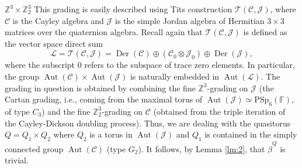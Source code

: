 \documentclass[a4paper,reqno]{amsart}
\theoremstyle{definition}
\numberwithin{theorem}{section}
\numberwithin{equation}{section}
\begin{document}
$\boxed{{\mathbb{Z}}^3\times{\mathbb{Z}}_2^3}$\quad 
This grading is easily described using Tits construction ${\mathcal{T}}({\mathcal{C}},{\mathcal{J}})$, where ${\mathcal{C}}$ is the Cayley algebra and ${\mathcal{J}}$ is the simple Jordan algebra of Hermitian $3\times 3$ matrices over the quaternion algebra. Recall again that ${\mathcal{T}}({\mathcal{C}},{\mathcal{J}})$ is defined as the vector space direct sum
\[
{\mathcal{L}}={\mathcal{T}}({\mathcal{C}},{\mathcal{J}})=\operatorname{\mathrm{Der}}({\mathcal{C}})\oplus({\mathcal{C}}_0\otimes{\mathcal{J}}_0)\oplus\operatorname{\mathrm{Der}}({\mathcal{J}}),
\]
where the subscript $0$ refers to the subspace of trace zero elements. 
In particular, the group $\operatorname{\mathrm{Aut}}({\mathcal{C}})\times\operatorname{\mathrm{Aut}}({\mathcal{J}})$ is naturally embedded in $\operatorname{\mathrm{Aut}}({\mathcal{L}})$.
The grading in question is obtained by combining the fine ${\mathbb{Z}}^3$-grading on ${\mathcal{J}}$ (the Cartan grading, i.e., coming from the maximal torus of $\operatorname{\mathrm{Aut}}({\mathcal{J}})\simeq{\mathrm{PSp}}_6({\mathbb{F}})$, of type $C_3$) and the fine ${\mathbb{Z}}_2^3$-grading on ${\mathcal{C}}$ (obtained from the triple iteration of the Cayley-Dickson doubling process). 
Thus, we are dealing with the quasitorus $Q=Q_1\times Q_2$ where $Q_2$ is a torus in $\operatorname{\mathrm{Aut}}({\mathcal{J}})$ and $Q_1$ is contained in the simply connected group $\operatorname{\mathrm{Aut}}({\mathcal{C}})$ (type $G_2$). It follows, by Lemma \ref{lm:2}, that $\hat{\beta}^Q$ is trivial. 

\medskip
\end{document}
